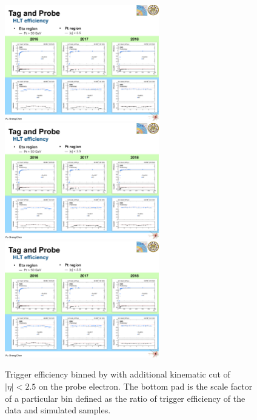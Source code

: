 \begin{figure}\centering
    \includegraphics[width=0.6\textwidth]{figure/appendix_16pt.pdf}
    \includegraphics[width=0.6\textwidth]{figure/appendix_17pt.pdf}
    \includegraphics[width=0.6\textwidth]{figure/appendix_18pt.pdf}
    \caption[Trigger efficiency binned by \PT]
    {
        Trigger efficiency binned by \PT with additional kinematic cut of $|\eta|<2.5$ on the probe electron.
        The bottom pad is the scale factor of a particular bin defined as the ratio of trigger efficiency of the data and simulated samples.
    }
    \label{fig:appendix_pteff}
\end{figure}

